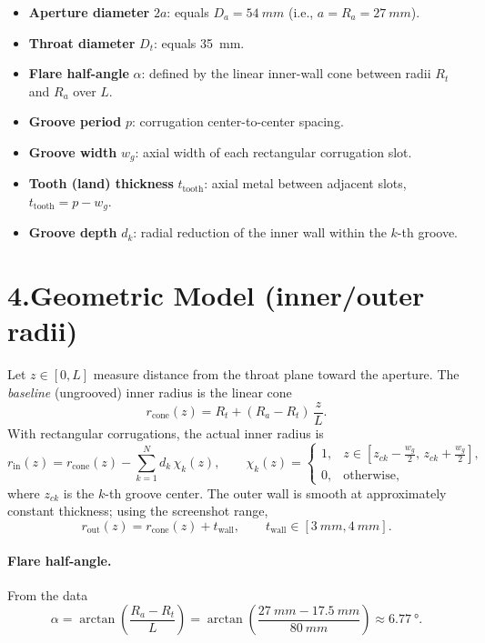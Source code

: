 \documentclass[11pt]{article}
\begin{document}
\begin{itemize}[leftmargin=1.4em]

  \item \textbf{Aperture diameter} \textbf{$2a$}: equals $D_a=\SI{54}{mm}$ (i.e., $a=R_a=\SI{27}{mm}$).
  \item \textbf{Throat diameter} $D_t$: equals \SI{35}{mm}.
  \item \textbf{Flare half-angle} $\alpha$: defined by the linear inner-wall cone between radii $R_t$ and $R_a$ over $L$.
  \item \textbf{Groove period} $p$: corrugation center-to-center spacing.
  \item \textbf{Groove width} $w_g$: axial width of each rectangular corrugation slot.
  \item \textbf{Tooth (land) thickness} $t_{\text{tooth}}$: axial metal between adjacent slots, $t_{\text{tooth}}=p-w_g$.
  \item \textbf{Groove depth} $d_k$: radial reduction of the inner wall within the $k$-th groove.
\end{itemize}

\section*{4.\quad Geometric Model (inner/outer radii)}
Let $z\in[0,L]$ measure distance from the throat plane toward the aperture.
The \emph{baseline} (ungrooved) inner radius is the linear cone
\begin{equation}
r_{\text{cone}}(z)=R_t + (R_a - R_t)\,\frac{z}{L}.
\end{equation}
With rectangular corrugations, the actual inner radius is
\begin{equation}
r_{\text{in}}(z)=r_{\text{cone}}(z) - \sum_{k=1}^{N} d_k\,\chi_k(z),\qquad
\chi_k(z)=\begin{cases}
1, & z\in[z_{ck}-\tfrac{w_g}{2},\,z_{ck}+\tfrac{w_g}{2}],\\[2pt]
0, & \text{otherwise},
\end{cases}
\end{equation}
where $z_{ck}$ is the $k$-th groove center. The outer wall is smooth at approximately constant thickness; using the screenshot range,
\begin{equation}
r_{\text{out}}(z)=r_{\text{cone}}(z)+t_{\text{wall}},\qquad t_{\text{wall}}\in[\SI{3}{mm},\SI{4}{mm}].
\end{equation}

\paragraph{Flare half-angle.} From the data
\begin{equation}
\alpha=\arctan\!\left(\frac{R_a-R_t}{L}\right)
= \arctan\!\left(\frac{\SI{27}{mm}-\SI{17.5}{mm}}{\SI{80}{mm}}\right)
\approx \SI{6.77}{\degree}.
\end{equation}
\end{document}
